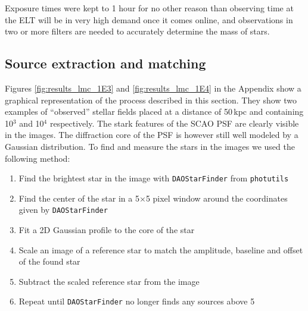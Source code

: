 Exposure times were kept to 1 hour for no other reason than observing time at the ELT will be in very high demand once it comes online, and observations in two or more filters are needed to accurately determine the mass of stars.


\subsection{Source extraction and matching}
Figures \ref{fig:results_lmc_1E3} and \ref{fig:results_lmc_1E4} in the Appendix show a graphical representation of the process described in this section. They show two examples of ``observed'' stellar fields placed at a distance of 50\,kpc and containing 10$^3$ and 10$^4$ \spa respectively. The stark features of the SCAO PSF
are clearly visible in the images. The diffraction core of the PSF is however still well modeled by a Gaussian distribution.
To find and measure the stars in the images we used the following method:

\begin{enumerate}
    \item Find the brightest star in the image with \verb+DAOStarFinder+ from \verb+photutils+ \citep{photutils}
    \item Find the center of the star in a 5$\times$5 pixel window around the coordinates given by \verb+DAOStarFinder+
    \item Fit a 2D Gaussian profile to the core of the star
    \item Scale an image of a reference star to match the amplitude, baseline and offset of the found star
    \item Subtract the scaled reference star from the image
    \item Repeat until \verb+DAOStarFinder+ no longer finds any sources above 5\,\sig
\end{enumerate}

